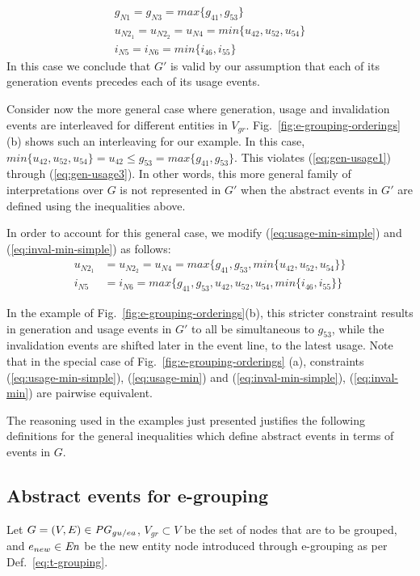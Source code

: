 \begin{align}
g_{N1} = g_{N3} = max\{g_{41}, g_{53}\}   \label{eq:max} \\
u_{N2_1} = u_{N2_2}  = u_{N4} = min\{u_{42},  u_{52},  u_{54}\}   \label{eq:usage-min-simple} \\
i_{N5} = i_{N6}  = min \{   i_{46},  i_{55} \}   \label{eq:inval-min-simple}
\end{align}
In this case we conclude that $G'$ is valid by our assumption that each of its generation events precedes each of its usage events.

Consider now the more general case where generation, usage and invalidation events are interleaved for different entities in $V_{gr}$. Fig.~\ref{fig:e-grouping-orderings}(b) shows such an interleaving for our example. In this case, 
$min \{   u_{42},  u_{52},  u_{54} \} = u_{42} \leq g_{53} = max\{g_{41}, g_{53}\}$.
%
This violates (\ref{eq:gen-usage1}) through (\ref{eq:gen-usage3}).  In other words, this more general family of interpretations over $G$ is not represented in $G'$ when the abstract events in $G'$ are defined using the inequalities above. 

In order to account for this general case, we modify  (\ref{eq:usage-min-simple}) and (\ref{eq:inval-min-simple}) as follows:
\begin{align}
u_{N2_1} &= u_{N2_2}  = u_{N4} = max\{ g_{41}, g_{53}, min \{u_{42},  u_{52},  u_{54}\}\}  \label{eq:usage-min} \\
i_{N5} &= i_{N6}  = max\{g_{41}, g_{53}, u_{42},  u_{52},  u_{54}, min\{i_{46},  i_{55}\}\}   \label{eq:inval-min}
\end{align}
%

In the example of Fig.~\ref{fig:e-grouping-orderings}(b), this stricter constraint results in  generation and usage events in $G'$ to all be simultaneous to $g_{53}$, while the invalidation events are shifted later in the event line, to the latest usage. Note that in the special case of Fig.~\ref{fig:e-grouping-orderings} (a), constraints (\ref{eq:usage-min-simple}), (\ref{eq:usage-min}) and (\ref{eq:inval-min-simple}), (\ref{eq:inval-min})  are pairwise equivalent.

The reasoning used in the examples just presented justifies the following definitions for the general inequalities which define abstract events in terms of events in $G$.

\subsection{Abstract events for e-grouping}
\label{sec:abstract-events-for-e-grouping}
%
Let $G=(V,E) \in \mathit{PG}_{gu/ea}$, $V_{gr} \subset V$ be the set of nodes that are to be grouped, and  $e_{new} \in \mathit{En}$ be the new entity node introduced through e-grouping as per Def.~\ref{eq:t-grouping}.
% 


